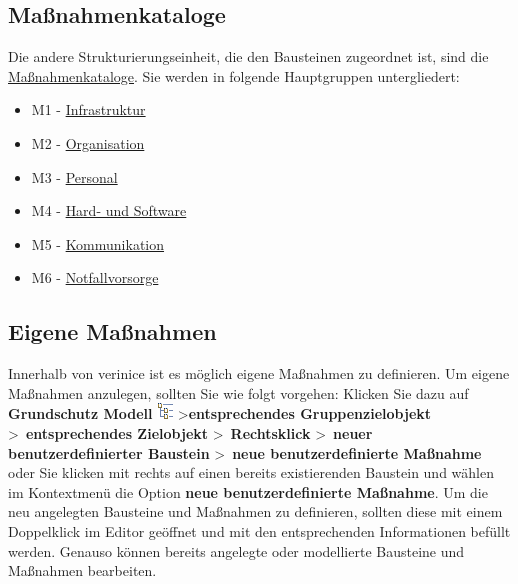 \documentclass[a4paper,10pt]{book}
\begin{document}
\subsection{Maßnahmenkataloge}
Die andere Strukturierungseinheit, die den Bausteinen zugeordnet ist, sind die \href{https://www.bsi.bund.de/cln_156/DE/Themen/weitereThemen/ITGrundschutzKataloge/Inhalt/Massnahmenkataloge/massnahmenkataloge_node.html}{Maßnahmenkataloge}. Sie werden in folgende Hauptgruppen untergliedert:
\begin{itemize}
\item M1 - \href{https://www.bsi.bund.de/cln_156/DE/Themen/weitereThemen/ITGrundschutzKataloge/Inhalt/Massnahmenkataloge/M1Infrastruktur/m1infrastruktur_node.html}{Infrastruktur}
\item M2 - \href{https://www.bsi.bund.de/cln_156/DE/Themen/weitereThemen/ITGrundschutzKataloge/Inhalt/Massnahmenkataloge/M2Organisation/m2organisation_node.html}{Organisation}
\item M3 - \href{https://www.bsi.bund.de/cln_156/DE/Themen/weitereThemen/ITGrundschutzKataloge/Inhalt/Massnahmenkataloge/M3Personal/m3personal_node.html}{Personal}
\item M4 - \href{https://www.bsi.bund.de/cln_156/DE/Themen/weitereThemen/ITGrundschutzKataloge/Inhalt/Massnahmenkataloge/M4HardwareundSoftware/m4hardwareundsoftware_node.html}{Hard- und Software}
\item M5 - \href{https://www.bsi.bund.de/cln_156/DE/Themen/weitereThemen/ITGrundschutzKataloge/Inhalt/Massnahmenkataloge/M5Kommunikation/m5kommunikation_node.html}{Kommunikation}
\item M6 - \href{https://www.bsi.bund.de/cln_156/DE/Themen/weitereThemen/ITGrundschutzKataloge/Inhalt/Massnahmenkataloge/M6Notfallversorgung/m6notfallvorsorge_node.html}{Notfallvorsorge}
\end{itemize}

\subsection{Eigene Maßnahmen}
Innerhalb von verinice ist es möglich eigene Maßnahmen zu definieren. Um eigene Maßnahmen anzulegen, sollten Sie wie folgt vorgehen:
Klicken Sie dazu auf \textbf{Grundschutz Modell} \includegraphics[height=2ex]{Icon/GS_Modell.png} \textgreater \textbf{entsprechendes Gruppenzielobjekt}
\textgreater\ \textbf{entsprechendes Zielobjekt} \textgreater\ \textbf{Rechtsklick} \textgreater\ \textbf{neuer benutzerdefinierter Baustein} \textgreater\
\textbf{neue benutzerdefinierte Maßnahme} oder Sie klicken mit rechts auf einen bereits existierenden Baustein und wählen im Kontextmenü
die Option \textbf{neue benutzerdefinierte Maßnahme}.
Um die neu angelegten Bausteine und Maßnahmen zu definieren, sollten diese mit einem Doppelklick im Editor geöffnet und mit den entsprechenden
Informationen befüllt werden. Genauso können bereits angelegte oder modellierte Bausteine und Maßnahmen bearbeiten.
\end{document}

